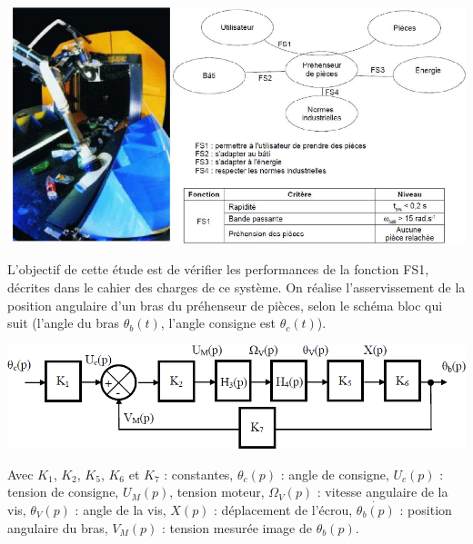 \documentclass[10pt,fleqn]{article} %
\begin{document}
\begin{multicols}{2}
\begin{center}
\includegraphics[width=\linewidth]{images/fig2}
\end{center}

L'objectif de cette étude est de vérifier les performances de la fonction FS1, décrites dans le cahier des charges de ce système. On réalise l'asservissement de la position angulaire d'un bras du préhenseur de pièces, selon le schéma bloc qui suit (l'angle du bras $\theta_b(t)$, l'angle consigne est $\theta_c(t)$).

\begin{center}
\includegraphics[width=\linewidth]{images/fig_3}
\end{center}

Avec $K_1$, $K_2$, $K_5$, $K_6$ et $K_7$ : constantes, $\theta_c(p)$ : angle de consigne, $U_c(p)$ : tension de consigne, $U_M(p)$, tension moteur, $\Omega_V(p)$ : vitesse angulaire de la vis, $\theta_V(p)$ : angle de la vis, $X(p)$ : déplacement de l'écrou, $\dot{\theta_b(p)}$ : position angulaire du bras, $V_M(p)$ : tension mesurée image de $\theta_b(p)$.


\end{multicols}
\end{document}
